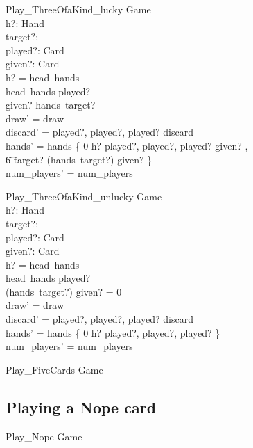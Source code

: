 \documentclass[11pt, fuzz]{article}
\begin{document}
\begin{schema}{Play\_ThreeOfaKind\_lucky}
    \Delta Game \\
    h?: Hand \\
    target?: \nat \\
    played?: Card \\
    given?: Card \\
\where
    h? = head~hands \\
    head~hands \bcount played?  \\
    given? \inbag hands~target? \\
    draw' = draw \\
    discard' = \langle played?, played?, played? \rangle \cat discard \\
    hands' = hands \oplus \{ 0 \mapsto h? \uminus \lbag played?, played?, played? \rbag \uplus \lbag given? \rbag, \\ \t6 target? \mapsto (hands~target?) \uminus \lbag given? \rbag \} \\
    num\_players' = num\_players 
\end{schema}

\begin{schema}{Play\_ThreeOfaKind\_unlucky}
    \Delta Game \\
    h?: Hand \\
    target?: \nat \\
    played?: Card \\
    given?: Card \\
\where
    h? = head~hands \\
    head~hands \bcount played?  \\
    (hands~target?) \bcount given? = 0 \\
    draw' = draw \\
    discard' = \langle played?, played?, played? \rangle \cat discard \\
    hands' = hands \oplus \{ 0 \mapsto h? \uminus \lbag played?, played?, played? \rbag \} \\
    num\_players' = num\_players
\end{schema}



\begin{schema}{Play\_FiveCards}
    \Delta Game
\end{schema}

\subsection{Playing a Nope card}

\begin{schema}{Play\_Nope}
    \Delta Game
\end{schema}
\end{document}
